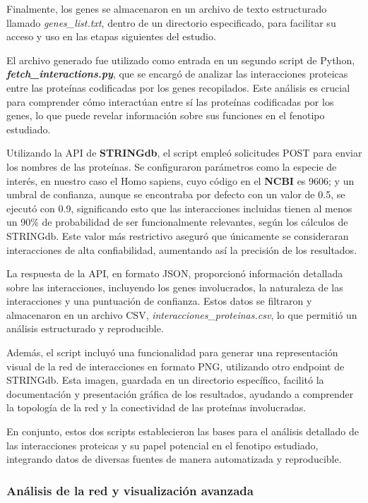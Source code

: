 Finalmente, los genes se almacenaron en un archivo de texto estructurado llamado \textit{genes\_list.txt}, dentro de un directorio especificado, para facilitar su acceso y uso en las etapas siguientes del estudio.

El archivo generado fue utilizado como entrada en un segundo script de Python, \textbf{\textit{fetch\_interactions.py}}, que se encargó de analizar las interacciones proteicas entre las proteínas codificadas por los genes recopilados. Este análisis es crucial para comprender cómo interactúan entre sí las proteínas codificadas por los genes, lo que puede revelar información sobre sus funciones en el fenotipo estudiado.

Utilizando la API de \textbf{STRINGdb}, el script empleó solicitudes POST para enviar los nombres de las proteínas. Se configuraron parámetros como la especie de interés, en nuestro caso el Homo sapiens, cuyo código en el \textbf{NCBI} es 9606; y un umbral de confianza, aunque se encontraba por defecto con un valor de 0.5, se ejecutó con 0.9, significando esto que las interacciones incluidas tienen al menos un 90\% de probabilidad de ser funcionalmente relevantes, según los cálculos de STRINGdb. Este valor más restrictivo aseguró que únicamente se consideraran interacciones de alta confiabilidad, aumentando así la precisión de los resultados.

La respuesta de la API, en formato JSON, proporcionó información detallada sobre las interacciones, incluyendo los genes involucrados, la naturaleza de las interacciones y una puntuación de confianza. Estos datos se filtraron y almacenaron en un archivo CSV, \textit{interacciones\_proteinas.csv}, lo que permitió un análisis estructurado y reproducible.

Además, el script incluyó una funcionalidad para generar una representación visual de la red de interacciones en formato PNG, utilizando otro endpoint de STRINGdb. Esta imagen, guardada en un directorio específico, facilitó la documentación y presentación gráfica de los resultados, ayudando a comprender la topología de la red y la conectividad de las proteínas involucradas.

En conjunto, estos dos scripts establecieron las bases para el análisis detallado de las interacciones proteicas y su papel potencial en el fenotipo estudiado, integrando datos de diversas fuentes de manera automatizada y reproducible.

\subsubsection{Análisis de la red y visualización avanzada}

